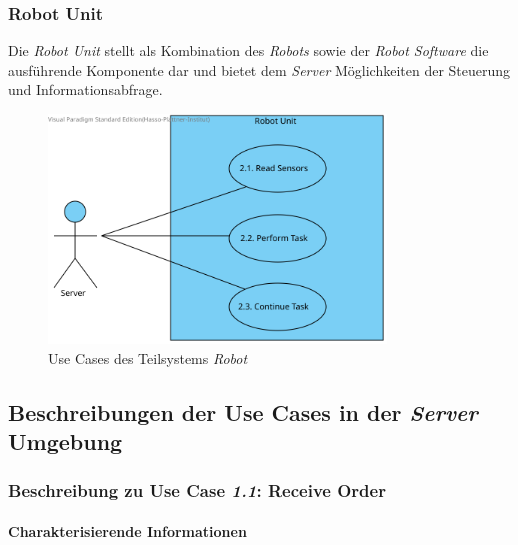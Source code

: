 			\subsubsection{Robot Unit}
			Die \emph{Robot Unit} stellt als Kombination des \emph{Robots} sowie der \emph{Robot Software} die ausführende Komponente dar und bietet dem \emph{Server} Möglichkeiten der Steuerung und Informationsabfrage.
				\begin{figure}[H]
					\centering
					\includegraphics[width=0.8\textwidth]{img/2-Analyse-RobotUnit}
					\caption{Use Cases des Teilsystems \emph{Robot}}
					\label{fig:3-1-use-cases-robot-unit}
				\end{figure}

		\pagebreak

		\subsection{Beschreibungen der Use Cases in der \emph{Server} Umgebung}
			\subsubsection{Beschreibung zu Use Case \emph{1.1}: Receive Order}	
			\paragraph*{Charakterisierende Informationen}
			
